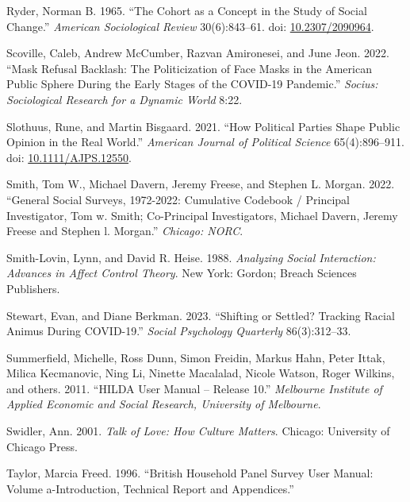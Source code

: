 \documentclass[
  12pt,
]{article}
\newlength{\cslhangindent}
\newlength{\cslentryspacingunit} %
\newenvironment{CSLReferences}[2] %
 {%
  \setlength{\parindent}{0pt}
  \ifodd #1
  \let\oldpar\par
  \def\par{\hangindent=\cslhangindent\oldpar}
  \fi
  \setlength{\parskip}{#2\cslentryspacingunit}
 }%
 {}
\begin{document}
\begin{CSLReferences}{1}{0}
\leavevmode{}%
Ryder, Norman B. 1965. {``The {Cohort} as a {Concept} in the {Study} of
{Social} {Change}.''} \emph{American Sociological Review} 30(6):843--61.
doi: \href{https://doi.org/10.2307/2090964}{10.2307/2090964}.

\leavevmode{}%
Scoville, Caleb, Andrew McCumber, Razvan Amironesei, and June Jeon.
2022. {``Mask {Refusal} {Backlash}: {The} {Politicization} of {Face}
{Masks} in the {American} {Public} {Sphere} During the {Early} {Stages}
of the {COVID}-19 {Pandemic}.''} \emph{Socius: Sociological Research for
a Dynamic World} 8:22.

\leavevmode{}%
Slothuus, Rune, and Martin Bisgaard. 2021. {``How {Political} {Parties}
{Shape} {Public} {Opinion} in the {Real} {World}.''} \emph{American
Journal of Political Science} 65(4):896--911. doi:
\href{https://doi.org/10.1111/AJPS.12550}{10.1111/AJPS.12550}.

\leavevmode{}%
Smith, Tom W., Michael Davern, Jeremy Freese, and Stephen L. Morgan.
2022. {``General Social Surveys, 1972-2022: Cumulative Codebook /
Principal Investigator, Tom w. Smith; Co-Principal Investigators,
Michael Davern, Jeremy Freese and Stephen l. Morgan.''} \emph{Chicago:
NORC}.

\leavevmode{}%
Smith-Lovin, Lynn, and David R. Heise. 1988. \emph{Analyzing {Social}
{Interaction}: {Advances} in {Affect} {Control} {Theory}}. New York:
Gordon; Breach Sciences Publishers.

\leavevmode{}%
Stewart, Evan, and Diane Berkman. 2023. {``Shifting or Settled? Tracking
Racial Animus During COVID-19.''} \emph{Social Psychology Quarterly}
86(3):312--33.

\leavevmode{}%
Summerfield, Michelle, Ross Dunn, Simon Freidin, Markus Hahn, Peter
Ittak, Milica Kecmanovic, Ning Li, Ninette Macalalad, Nicole Watson,
Roger Wilkins, and others. 2011. {``HILDA User Manual -- Release 10.''}
\emph{Melbourne Institute of Applied Economic and Social Research,
University of Melbourne}.

\leavevmode{}%
Swidler, Ann. 2001. \emph{Talk of {Love}: {How} {Culture} {Matters}}.
Chicago: University of Chicago Press.

\leavevmode{}%
Taylor, Marcia Freed. 1996. {``British Household Panel Survey User
Manual: Volume a-Introduction, Technical Report and Appendices.''}


\end{CSLReferences}
\end{document}
